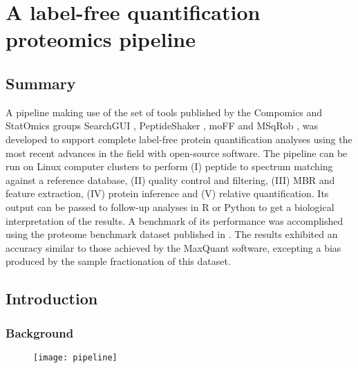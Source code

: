 \chapter{A label-free quantification proteomics pipeline}
\label{chap:pipeline}


\section*{Summary}

A pipeline making use of the set of tools published by the Compomics  and StatOmics groups SearchGUI \cite{Barsnes2018}, PeptideShaker \cite{Vaudel2015}, moFF \cite{Argentini2016} and MSqRob \cite{Goeminne2016} , was developed to support complete label-free protein quantification analyses using the most recent advances in the field with open-source software. The pipeline can be run on Linux computer clusters to perform (I) peptide to spectrum matching against a reference database, (II) quality control and filtering, (III) \ac{MBR} and feature extraction, (IV) protein inference and (V) relative quantification. Its output can be passed to follow-up analyses in R or Python to get a biological interpretation of the results.  A benchmark of its performance was accomplished using the proteome benchmark dataset published in \cite{Cox2014}. The results exhibited an accuracy similar to those achieved by the MaxQuant \cite{Cox2014} software, excepting a bias produced by the sample fractionation of this dataset.


\section{Introduction}

\subsection{Background}

\begin{figure}[!h]
\texttt{[image: pipeline]}
\label{fig:pipeline}
\end{figure}


